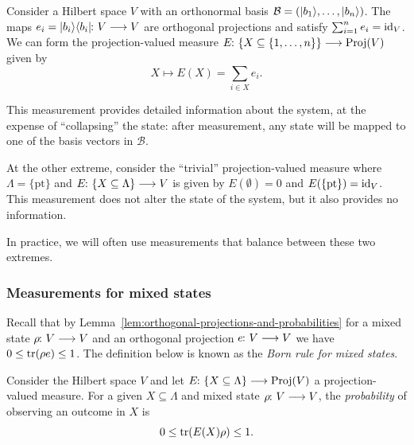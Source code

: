 \documentclass[a4paper, oneside, 12pt]{amsart}
\begin{document}
\begin{example}\label{ex:onb-measures}
  Consider a Hilbert space \( V \) with an orthonormal basis \( \mathcal{B} = (\lvert b_1\rangle, \dots, \lvert b_n\rangle) \).
  The maps \( e_i = \ket{b_i}\bra{b_i} \from V \to V \) are orthogonal projections and satisfy \(\sum_{i=1}^n e_i = \mathrm{id}_V\).
  We can form the projection-valued measure \(E \from\{X \subseteq\{1, \dots , n\}\} \to \mathrm{Proj}(V)\) given by
  \begin{equation*}
    X \mapsto E(X) = \sum_{i \in X} e_{i}.
  \end{equation*}

  This measurement provides detailed information about the system,  at the expense of ``collapsing'' the state: after measurement, any state will be mapped to one of the basis vectors in \( \mathcal{B} \).

  At the other extreme, consider the ``trivial'' projection-valued measure where
  \(\Lambda =\{\mathrm{pt}\}\) and \(E \from\{X \subseteq \Lambda\} \to V\) is given by \(E(\emptyset)= 0\) and \(E(\{\mathrm{pt}\}) = \mathrm{id}_{V}\).
  This measurement does not alter the state of the system, but it also provides no information.

  In practice, we will often use measurements that balance between these two extremes.
\end{example}


\subsubsection{Measurements for mixed states}\label{sec:measurements-for-mixed-states}
Recall that by Lemma~\ref{lem:orthogonal-projections-and-probabilities} for a mixed state \(\rho \from V \to V\) and an orthogonal projection \(e\from V\to V\) we have \(0 \leq \operatorname{tr}(\rho e)\leq 1\).
The definition below is known as the \emph{Born rule for mixed states}.

\begin{definition}\label{def:Born-rule-for-projective-measurment}
  Consider the Hilbert space \(V\) and let \( E \from\{X \subseteq \Lambda\} \to \mathrm{Proj}(V)\) a projection-valued measure.
  For a given \(X \subseteq \Lambda\) and mixed state \(\rho \from V \to V\), the \emph{probability} of observing an outcome in \( X \) is
  \begin{equation}
    0 \leq \operatorname{tr}(E(X)\rho) \leq 1.
  \end{equation}
\end{definition}
\end{document}
